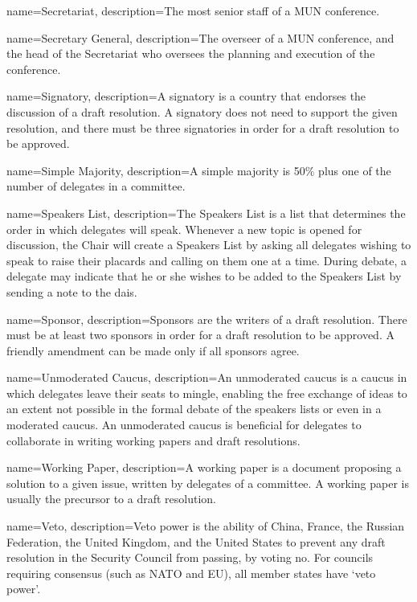 {
	name={Secretariat},
	description={The most senior staff of a MUN conference.}
}

{
	name={Secretary General},
	description={The overseer of a MUN conference, and the head of the Secretariat who oversees the planning and execution of the conference.}
}

{
	name={Signatory},
	description={A signatory is a country that endorses the discussion of a draft resolution. A signatory does not need to support the given resolution, and there must be three signatories in order for a draft resolution to be approved.}
}

{
	name={Simple Majority},
	description={A simple majority is 50\% plus one of the number of delegates in a committee.}
}

{
	name={Speakers List},
	description={The Speakers List is a list that determines the order in which delegates will speak. Whenever a new topic is opened for discussion, the Chair will create a Speakers List by asking all delegates wishing to speak to raise their placards and calling on them one at a time. During debate, a delegate may indicate that he or she wishes to be added to the Speakers List by sending a note to the dais.}
}

{
	name={Sponsor},
	description={Sponsors are the writers of a draft resolution. There must be at least two sponsors in order for a draft resolution to be approved. A friendly amendment can be made only if all sponsors agree.}
}

{
	name={Unmoderated Caucus},
	description={An unmoderated caucus is a caucus in which delegates leave their seats to mingle, enabling the free exchange of ideas to an extent not possible in the formal debate of the speakers lists or even in a moderated caucus. An unmoderated caucus is beneficial for delegates to collaborate in writing working papers and draft resolutions.}
}

{
	name={Working Paper},
	description={A working paper is a document proposing a solution to a given issue, written by delegates of a committee. A working paper is usually the precursor to a draft resolution.}
}

{
	name={Veto},
	description={Veto power is the ability of China, France, the Russian Federation, the United Kingdom, and the United States to prevent any draft resolution in the Security Council from passing, by voting no. For councils requiring consensus (such as NATO and EU), all member states have `veto power'.}
}

